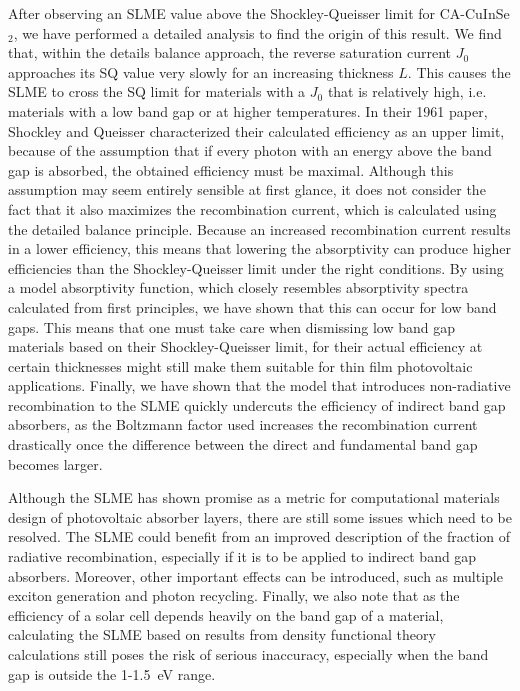 \begin{refsection}
After observing an \gls{SLME} value above the Shockley-Queisser limit for 
\mbox{CA-CuInSe$_2$}, we have performed a detailed analysis to find the origin 
of this result. We find that, within the details balance approach, the reverse 
saturation current $J_0$ approaches its \gls{SQ} value very slowly for an increasing 
thickness $L$. This causes the \gls{SLME} to cross the \gls{SQ} limit for materials with a 
$J_0$ that is relatively high, i.e. materials with a low band gap or at higher 
temperatures. In their 1961 paper, Shockley and Queisser characterized their 
calculated efficiency as an upper limit, because of the assumption that if 
every photon with an energy above the band gap is absorbed, the obtained 
efficiency must be maximal. Although this assumption may seem entirely 
sensible at first glance, it does not consider the fact that it also maximizes 
the recombination current, which is calculated using the detailed balance 
principle. Because an increased recombination current results in a lower efficiency, 
this means that lowering the absorptivity can produce higher efficiencies than 
the Shockley-Queisser limit under the right conditions. By using a model 
absorptivity function, which closely resembles absorptivity spectra calculated 
from first principles, we have shown that this can occur for low band gaps. 
This means that one must take care when dismissing low band gap materials 
based on their Shockley-Queisser limit, for their actual efficiency at certain 
thicknesses might still make them suitable for thin film photovoltaic 
applications. Finally, we have shown that the model that introduces non-radiative 
recombination to the \gls{SLME} quickly undercuts the efficiency of indirect band 
gap absorbers, as the Boltzmann factor used increases the recombination 
current drastically once the difference between the direct and fundamental 
band gap becomes larger. 

Although the \gls{SLME} has shown promise as a metric for computational materials design 
of photovoltaic absorber layers, there are still some issues which need to be 
resolved. The \gls{SLME} could benefit from an improved description of the fraction of 
radiative recombination, especially if it is to be applied to indirect band gap absorbers. 
Moreover, other important effects can be introduced, such as multiple exciton 
generation and photon recycling. Finally, we also note that as the efficiency of 
a solar cell depends heavily on the band gap of a material, calculating the \gls{SLME} 
based on results from density functional theory calculations still poses the risk 
of serious inaccuracy, especially when the band gap is outside the 1-1.5~\si{\electronvolt} range.

\clearpage
\pagestyle{biblio}
\printbibliography 

\end{refsection} 

